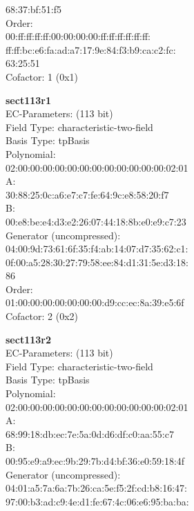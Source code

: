     68:37:bf:51:f5\\
Order: \\
    00:ff:ff:ff:ff:00:00:00:00:ff:ff:ff:ff:ff:ff:\\
    ff:ff:bc:e6:fa:ad:a7:17:9e:84:f3:b9:ca:c2:fc:\\
    63:25:51\\
Cofactor:  1 (0x1)\\
\item \textbf{ sect113r1 }\\
EC-Parameters: (113 bit)\\
Field Type: characteristic-two-field\\
Basis Type: tpBasis\\
Polynomial:\\
    02:00:00:00:00:00:00:00:00:00:00:00:00:02:01\\
A:   \\
    30:88:25:0c:a6:e7:c7:fe:64:9c:e8:58:20:f7\\
B:   \\
    00:e8:be:e4:d3:e2:26:07:44:18:8b:e0:e9:c7:23\\
Generator (uncompressed):\\
    04:00:9d:73:61:6f:35:f4:ab:14:07:d7:35:62:c1:\\
    0f:00:a5:28:30:27:79:58:ee:84:d1:31:5e:d3:18:\\
    86\\
Order: \\
    01:00:00:00:00:00:00:00:d9:cc:ec:8a:39:e5:6f\\
Cofactor:  2 (0x2)\\
\item \textbf{ sect113r2 }\\
EC-Parameters: (113 bit)\\
Field Type: characteristic-two-field\\
Basis Type: tpBasis\\
Polynomial:\\
    02:00:00:00:00:00:00:00:00:00:00:00:00:02:01\\
A:   \\
    68:99:18:db:ec:7e:5a:0d:d6:df:c0:aa:55:c7\\
B:   \\
    00:95:e9:a9:ec:9b:29:7b:d4:bf:36:e0:59:18:4f\\
Generator (uncompressed):\\
    04:01:a5:7a:6a:7b:26:ca:5e:f5:2f:cd:b8:16:47:\\
    97:00:b3:ad:c9:4e:d1:fe:67:4c:06:e6:95:ba:ba:\\

